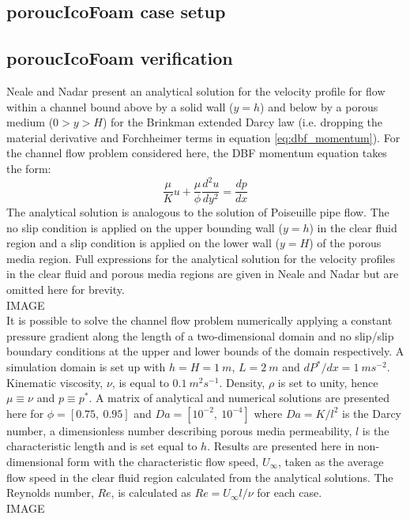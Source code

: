 \documentclass[a4paper,11pt]{report}
\begin{document}
\subsection{poroucIcoFoam case setup}

\subsection{poroucIcoFoam verification}
Neale and Nadar \cite{NealeNadar1974} present an analytical solution for the velocity profile for flow within a channel bound above by a solid wall ($y=h$) and below by a porous medium ($0>y>H$) for the Brinkman extended Darcy law (i.e. dropping the material derivative and Forchheimer terms in equation \ref{eq:dbf_momentum}). For the channel flow problem considered here, the DBF momentum equation takes the form:
\begin{equation}
    \frac{\mu}{K}u + \frac{\mu}{\phi}\frac{d^2u}{dy^2} = \frac{dp}{dx}
    \label{eq:channel_dbf_momentum}
\end{equation}
The analytical solution is analogous to the solution of Poiseuille pipe flow. The no slip condition is applied on the upper bounding wall ($y=h$) in the clear fluid region and a slip condition is applied on the lower wall ($y=H$) of the porous media region. Full expressions for the analytical solution for the velocity profiles in the clear fluid and porous media regions are given in Neale and Nadar \cite{NealeNadar1974} but are omitted here for brevity.
\vspace{5mm}\\
IMAGE
\vspace{5mm}\\
It is possible to solve the channel flow problem numerically applying a constant pressure gradient along the length of a two-dimensional domain and no slip/slip boundary conditions at the upper and lower bounds of the domain respectively. A simulation domain is set up with $h=H=1\ m$, $L=2\ m$ and $dP^*/dx=1\ ms^{-2}$. Kinematic viscosity, $\nu$, is equal to $0.1\ m^{2}s^{-1}$. Density, $\rho$ is set to unity, hence $\mu\equiv\nu$ and $p\equiv p^*$. A matrix of analytical and numerical solutions are presented here for $\phi=[0.75,\ 0.95]$ and $Da=[10^{-2},\ 10^{-4}]$ where $Da=K/l^{2}$ is the Darcy number, a dimensionless number describing porous media permeability, $l$ is the characteristic length and is set equal to $h$. Results are presented here in non-dimensional form with the characteristic flow speed, $U_{\infty}$, taken as the average flow speed in the clear fluid region calculated from the analytical solutions. The Reynolds number, $Re$, is calculated as $Re=U_{\infty}l/\nu$ for each case.
\vspace{5mm}\\
IMAGE
\end{document}
